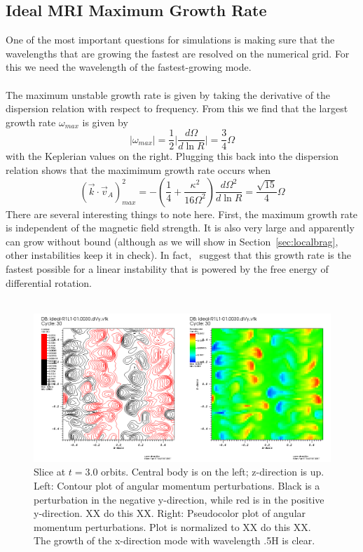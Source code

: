 \subsection{Ideal MRI Maximum Growth Rate}
One of the most important questions for simulations is making sure that the wavelengths that are growing the fastest are resolved on the numerical grid. For this we need the wavelength of the fastest-growing mode. \\
\\
The maximum unstable growth rate is given by taking the derivative of the dispersion relation with respect to frequency. From this we find that the largest growth rate $\omega_{max}$ is given by
\begin{equation}
  |\omega_{max}|=\frac12\big|\frac{d\Omega}{d\ln R}\big|=\frac34\Omega
\end{equation}
with the Keplerian values on the right. Plugging this back into the dispersion relation shows that the maximimum growth rate occurs when
\begin{equation}
  (\vec k\cdot\vec v_A)^2_{max}=-\left(\frac14+\frac{\kappa^2}{16\Omega^2}\right)\frac{d\Omega^2}{d\ln R}=\frac{\sqrt{15}}{4}\Omega \label{eq:idealmaxk}
\end{equation}
There are several interesting things to note here. First, the maximum growth rate is independent of the magnetic field strength. It is also very large and apparently can grow without bound (although as we will show in Section~\ref{sec:localbrag}, other instabilities keep it in check). In fact,~\citet{Balbus1992} suggest that this growth rate is the fastest possible for a linear instability that is powered by the free energy of differential rotation. \\
\\
\begin{figure}
  \begin{center}  
    \includegraphics[width=\textwidth, angle=0.]{img/ideal-R1L1-dVy-xz-t30-contpseudo.png}
  \end{center}
  \caption{Slice at $t=3.0$ orbits. Central body is on the left; z-direction is up. Left: Contour plot of angular momentum perturbations. Black is a perturbation in the negative y-direction, while red is in the positive y-direction. XX do this XX. Right: Pseudocolor plot of angular momentum perturbations. Plot is normalized to XX do this XX. The growth of the x-direction mode with wavelength .5H is clear.}
  \label{fig:idealgrowth}
\end{figure}
